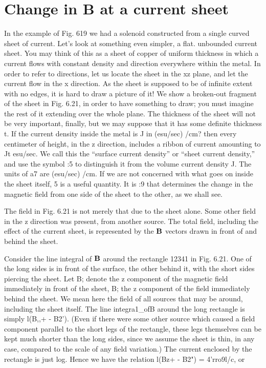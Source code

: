 \iffalse

\section{Change in B at a current sheet}

In the example of Fig. 619 we had a solenoid constructed from a
single curved sheet of current. Let's look at something even simpler,
a flat. unbounded current sheet. You may think of this as a sheet
of copper of uniform thickness in which a current flows with constant
density and direction everywhere within the metal. In order to refer
to directions, let us locate the sheet in the xz plane, and let the current
flow in the x direction. As the sheet is supposed to be of infinite extent
with no edges, it is hard to draw a picture of it! We show a
broken-out fragment of the sheet in Fig. 6.21, in order to have something
to draw; you must imagine the rest of it extending over the
whole plane. The thickness of the sheet will not be very important,
finally, but we may suppose that it has some definite thickness t. If
the current density inside the metal is J in (esu/sec) /cm? then every
centimeter of height, in the z direction, includes a ribbon of current
amounting to Jt esu/sec. We call this the ``surface current density''
or ``sheet current density,'' and use the symbol :5 to distinguish it from
the volume current density J. The units of a7 are (esu/sec) /cm. If
we are not concerned with what goes on inside the sheet itself, 5 is
a useful quantity. It is :9 that determines the change in the magnetic
field from one side of the sheet to the other, as we shall see.

The field in Fig. 6.21 is not merely that due to the sheet alone.
Some other field in the z direction was present, from another source.
The total field, including the effect of the current sheet, is represented
by the $\mathbf{B}$ vectors drawn in front of and behind the sheet.

Consider the line integral of $\mathbf{B}$ around the rectangle 12341 in
Fig. 6.21. One of the long sides is in front of the surface, the other
behind it, with the short sides piercing the sheet. Let B; denote the
z component of the magnetic field immediately in front of the sheet,
B; the z component of the field immediately behind the sheet. We
mean here the field of all sources that may be around, including the
sheet itself. The line integra1_ofB around the long rectangle is simply
l(B,,+ - B2'). (Even if there were some other source which caused
a field component parallel to the short legs of the rectangle, these
legs themselves can be kept much shorter than the long sides, since
we assume the sheet is thin, in any case, compared to the scale of any
field variation.) The current enclosed by the rectangle is just log.
Hence we have the relation l(Bz+ - B2") = 4'rro9l/c, or

